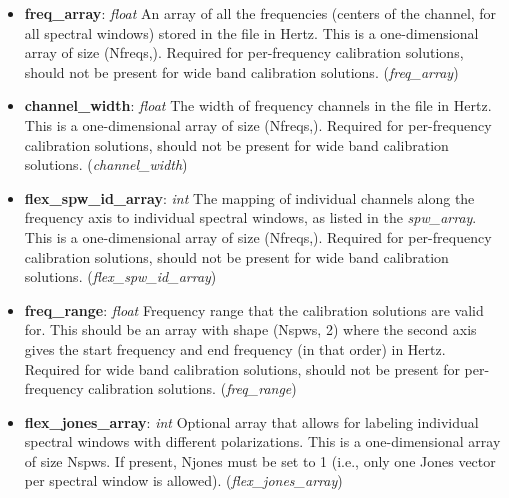 \documentclass[11pt, oneside]{article}
\begin{document}
\begin{itemize}
\item \textbf{freq\_array}: \textit{float} An array of all the frequencies (centers
  of the channel, for all spectral windows) stored in the file in Hertz. This is a
  one-dimensional array of size (Nfreqs,). Required for per-frequency calibration
  solutions, should not be present for wide band calibration solutions. (\textit{freq\_array})
\item \textbf{channel\_width}: \textit{float} The width of frequency channels in
  the file in Hertz. This is a one-dimensional array of size (Nfreqs,).
  Required for per-frequency calibration solutions, should not be present for wide band
  calibration solutions. (\textit{channel\_width})
\item \textbf{flex\_spw\_id\_array}: \textit{int} The mapping of individual
  channels along the frequency axis to individual spectral windows, as listed in
  the \textit{spw\_array}. This is a one-dimensional array of size (Nfreqs,).
  Required for per-frequency calibration solutions, should not be present for wide band
  calibration solutions. (\textit{flex\_spw\_id\_array})
\item \textbf{freq\_range}: \textit{float} Frequency range that the calibration solutions
  are valid for. This should be an array with shape (Nspws, 2) where
  the second axis gives the start frequency and end frequency (in that order) in Hertz.
  Required for wide band calibration solutions, should not be present for per-frequency
  calibration solutions. (\textit{freq\_range})
\item \textbf{flex\_jones\_array}: \textit{int} Optional array that allows for
  labeling individual spectral windows with different polarizations. This is a
  one-dimensional array of size Nspws. If present, Njones must be set to 1
  (i.e., only  one Jones vector per spectral window is allowed). (\textit{flex\_jones\_array})


\end{itemize}
\end{document}
